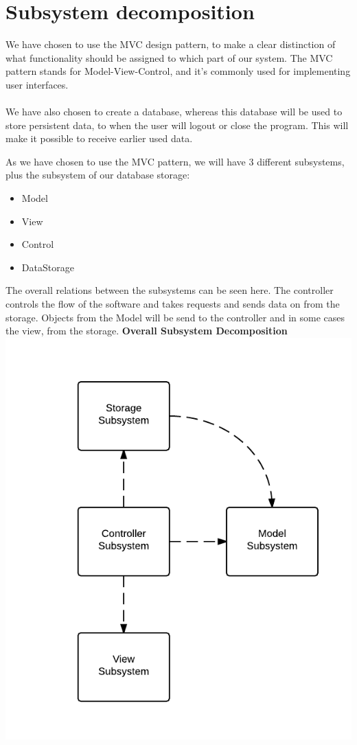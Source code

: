 \section{Subsystem decomposition}

We have chosen to use the MVC design pattern, to make a clear distinction of what functionality 
should be assigned to which part of our system. The MVC pattern stands for Model-View-Control, 
and it’s commonly used for implementing user interfaces.
\\\\
We have also chosen to create a database, whereas this database will be used to store persistent data, to when the user will logout or close the program. This will make it possible to receive earlier used data.

As we have chosen to use the MVC pattern, we will have 3 different subsystems, plus the subsystem of our database storage:

\begin{itemize}
	\item Model
	\item View
	\item Control
	\item DataStorage
\end{itemize}

The overall relations between the subsystems can be seen here. The controller controls the flow of the software and takes requests and sends data on from the storage. Objects from the Model will be send to the controller and in some cases the view, from the storage.\newpage
\textbf{Overall Subsystem Decomposition}\\
\includegraphics[scale=0.8]{OverallSubsystemDecomposition}

